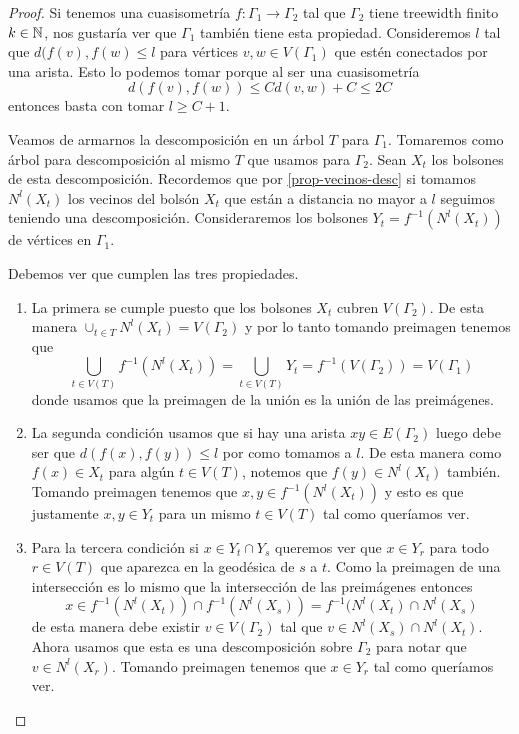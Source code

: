 \documentclass[tesis.tex]{subfiles}
\begin{document}
\begin{proof}
	Si tenemos una cuasisometría $f:\Gamma_1 \to \Gamma_2$ tal que $\Gamma_2$ tiene treewidth finito $k \in \mathbb N$, nos gustaría ver que $\Gamma_1$ también tiene esta propiedad.
	Consideremos $l$ tal que $d(f(v),f(w) \le l$ para vértices $v,w \in V(\Gamma_1)$ que estén conectados por una arista.
	Esto lo podemos tomar porque al ser una cuasisometría 
	\[
	d(f(v),f(w)) \le C d(v,w) + C  \le 2C
	\]
	entonces basta con tomar $l \ge C+1$.
	
	Veamos de armarnos la descomposición en un árbol $T$ para $\Gamma_1$.	
	Tomaremos como árbol para descomposición al mismo $T$ que usamos para $\Gamma_2$.
	Sean $X_t$ los bolsones de esta descomposición. 
	Recordemos que por \ref{prop-vecinos-desc} si tomamos $N^l(X_t)$ los vecinos del bolsón $X_t$ que están a distancia no mayor a $l$ seguimos teniendo una descomposición.  
	Consideraremos los bolsones $Y_t = f^{-1}(N^l(X_t))$ de vértices en $\Gamma_1$. 
	
	Debemos ver que cumplen las tres propiedades.
	
	\begin{enumerate}
		\item La primera se cumple puesto que los bolsones $X_t$ cubren $V(\Gamma_2)$. 
		De esta manera $\cup_{t \in T} N^l(X_t) = V(\Gamma_2)$ y por lo tanto tomando preimagen tenemos que
		\[
		\bigcup_{t \in V(T)} f^{-1} (N^l (X_t)) = \bigcup_{t \in V(T)} Y_t = f^{-1} (V(\Gamma_2)) = V(\Gamma_1)
		\] 
		donde usamos que la preimagen de la unión es la unión de las preimágenes.
		\item La segunda condición usamos que si hay una arista $xy \in E(\Gamma_2)$ luego debe ser que $d(f(x),f(y)) \le l$ por como tomamos a $l$.
		De esta manera como $f(x) \in X_t$ para algún $t \in V(T)$, notemos que $f(y) \in N^l(X_t)$ también. 
		Tomando preimagen tenemos que $x,y \in f^{-1}(N^l(X_t))$ y esto es que justamente $x,y \in Y_t$ para un mismo $t \in V(T)$ tal como queríamos ver.		
		\item Para la tercera condición si $x \in Y_t \cap Y_s$ queremos ver que $x \in Y_r$ para todo $r \in V(T)$ que aparezca en la geodésica de $s$ a $t$.
		Como la preimagen de una intersección es lo mismo que la intersección de las preimágenes entonces 
		\[
		x \in f^{-1}(N^l(X_t)) \cap f^{-1}(N^l(X_s)) = f^{-1}(N^l(X_t) \cap N^l (X_s)
		\]
		de esta manera debe existir $v \in V(\Gamma_2)$ tal que $v \in N^l(X_s) \cap N^l(X_t)$.
		Ahora usamos que esta es una descomposición sobre $\Gamma_2$ para notar que $v \in N^l(X_r)$.
		Tomando preimagen tenemos que $x \in Y_r$ tal como queríamos ver.
	\end{enumerate}
	

\end{proof}
\end{document}
